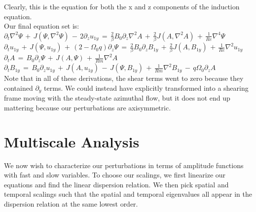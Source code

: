 \documentclass[letterpaper,12pt]{article}
\newcommand\reye{\mathrel{Re}}
\newcommand\reym{\mathrel{Rm}}
\begin{document}
Clearly, this is the equation for both the x and z components of the induction equation. \\

Our final equation set is: \\

$\partial_t \nabla^2 \Psi \, + \, J\left(\Psi, \nabla^2 \Psi\right) \, - \, 2 \partial_z u_{1y} \, = \, \frac{2}{\beta} B_0 \partial_z \nabla^2 A \, + \, \frac{2}{\beta}J\left(A, \nabla^2 A \right) \, + \, \frac{1}{\reye}\nabla^4 \Psi$ \\

$\partial_t u_{1y} \, + \, J\left(\Psi, u_{1y}\right) \, + \, \left(2 - \Omega_0 q\right) \partial_z \Psi \, = \, \frac{2}{\beta}B_0\partial_z B_{1y} \, + \, \frac{2}{\beta} J\left(A, B_{1y}\right) \, + \, \frac{1}{\reye} \nabla^2 u_{1y}$ \\

$\partial_t A \, = \, B_0 \partial_z \Psi \, + \, J\left(A, \Psi\right) \, + \, \frac{1}{\reym} \nabla^2 A$ \\

$\partial_t B_{1y} \, = \, B_0 \partial_z u_{1y} \, + \, J\left(A, u_{1y}\right) \, - \, J\left(\Psi, B_{1y}\right) \, + \, \frac{1}{\reym} \nabla^2 B_{1y}  \, - \, q \Omega_0 \partial_z A$ \\

Note that in all of these derivations, the shear terms went to zero because they contained $\partial_y$ terms. We could instead have explicitly transformed into a shearing frame moving with the steady-state azimuthal flow, but it does not end up mattering because our perturbations are axisymmetric. \\

\section*{Multiscale Analysis}

We now wish to characterize our perturbations in terms of amplitude functions with fast and slow variables. To choose our scalings, we first linearize our equations and find the linear dispersion relation. We then pick spatial and temporal scalings such that the spatial and temporal eigenvalues all appear in the dispersion relation at the same lowest order. \\
\end{document}
